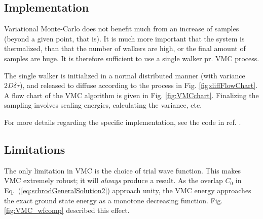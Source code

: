 \subsection{Implementation}

Variational Monte-Carlo does not benefit much from an increase of samples (beyond a given point, that is). It is much more important that the system is thermalized, than that the number of walkers are high, or the final amount of samples are huge. It is therefore sufficient to use a single walker pr. VMC process.

The single walker is initialized in a normal distributed manner (with variance $2D\delta\tau$), and released to diffuse according to the process in Fig. \ref{fig:diffFlowChart}. A flow chart of the VMC algorithm is given in Fig. \ref{fig:VMCchart}. Finalizing the sampling involves scaling energies, calculating the variance, etc. 

For more details regarding the specific implementation, see the code in ref. \cite{libBorealisCode}.

\subsection{Limitations}

The only limitation in VMC is the choice of trial wave function. This makes VMC extremely robust; it will \textit{always} produce a result. As the overlap $C_0$ in Eq.~(\ref{eq:schrodGeneralSolution2}) approach unity, the VMC energy approaches the exact ground state energy as a monotone decreasing function. Fig. \ref{fig:VMC_wfcomp} described this effect.


